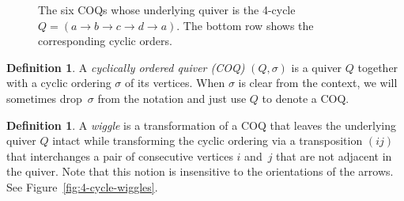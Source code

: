 \documentclass[11pt, letterpaper]{amsart}
\theoremstyle{definition}
\newtheorem{definition}[theorem]{Definition}
\numberwithin{equation}{section}
\begin{document}
{ %
\newcommand\cyclicLabels[5]{%
	\filldraw[black] (#4,#5)++(135:0.8cm) circle (2pt) node[above left=-1pt] {$a$} coordinate (a);
	\filldraw[black] (#4,#5)++(45:0.8cm) circle (2pt) node[above right=-1pt] {$#1$} coordinate (#1);
	\filldraw[black] (#4,#5)++(-45:0.8cm) circle (2pt) node[below right=-1pt] {$#2$} coordinate (#2);
	\filldraw[black] (#4,#5)++(-135:0.8cm) circle (2pt) node[below left=-1pt] {$#3$} coordinate (#3);
	\draw[black, dashed, decoration={markings, mark=at position 0 with {\arrow{<}}}, postaction={decorate}] (#4,#5) circle (0.8cm);
	\draw[black, -{stealth}, shorten >=3pt, shorten <= 3pt] (a) -- (b);
	\draw[black, -{stealth}, shorten >=3pt, shorten <= 3pt] (b) -- (c);
	\draw[black, -{stealth}, shorten >=3pt, shorten <= 3pt] (c) -- (d);
	\draw[black, -{stealth}, shorten >=3pt, shorten <= 3pt] (d) -- (a);
	\draw (#4,#5-1) node[below] {$(a, #1, #2, #3)$};
}

\begin{figure}[ht]
\caption{The six COQs whose underlying quiver is the 4-cycle $Q=(a \rightarrow b \rightarrow c \rightarrow d \rightarrow a)$.
The bottom row shows the corresponding cyclic orders.}
\vspace{-7pt}
\label{fig:4-cycle orderings}
\end{figure}

\begin{definition} 
A \emph{cyclically ordered quiver (COQ)} $(Q,\sigma)$
is a quiver $Q$ together with a cyclic ordering $\sigma$ of its vertices. 
When $\sigma$ is clear from the context, 
we will sometimes drop~$\sigma$ from the notation and just use $Q$ to denote a COQ.
\end{definition}

\begin{definition} 
A \emph{wiggle} is a transformation of a COQ that leaves the underlying quiver $Q$ intact while transforming the cyclic ordering via a transposition $(ij)$ that interchanges a pair of consecutive vertices $i$ and~$j$
that are not adjacent in the quiver. Note that this notion is insensitive to the orientations of the arrows. 
See Figure~\ref{fig:4-cycle-wiggles}. 
\end{definition}

}
\end{document}
